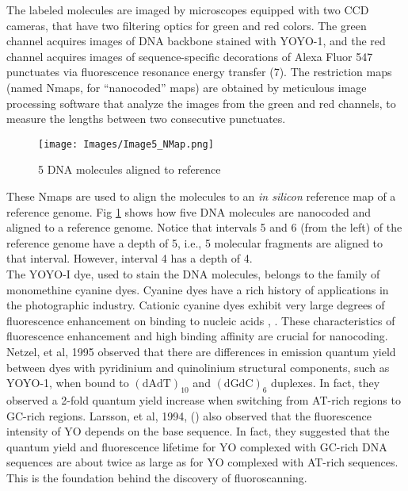 The labeled molecules are imaged by microscopes equipped with two CCD cameras, that have two filtering optics for green and red colors. The green channel acquires images of DNA backbone stained with YOYO-1, and the red channel acquires images of sequence-specific decorations of Alexa Fluor 547 punctuates via fluorescence resonance energy transfer (7). The restriction maps (named Nmaps, for ``nanocoded'' maps) are obtained by meticulous image processing software that analyze the images from the green and red channels, to measure the lengths between two consecutive punctuates. 

\begin{figure}[H]
\begin{center}
\texttt{[image: Images/Image5\_NMap.png]}
\end{center}
\caption{5 DNA molecules aligned to reference}
\label{fig:Fig2_NMap}
\end{figure}

These Nmaps are used to align the molecules to an {\emph{in silicon}} reference map of a reference genome. Fig \ref{fig:Fig2_NMap} shows how five DNA molecules are nanocoded and aligned to a reference genome. Notice that intervals 5 and 6 (from the left) of the reference genome have a depth of 5, i.e., 5 molecular fragments are aligned to that interval. However, interval 4 has a depth of 4. \\

The YOYO-I dye, used to stain the DNA molecules, belongs to the family of monomethine cyanine dyes. Cyanine dyes have a rich history of applications in the photographic industry. Cationic cyanine dyes exhibit very large degrees of fluorescence enhancement on binding to nucleic acids \cite{Rye_etal_1992_NAR}, \cite{Lee_etal_1986_Cytometry}. These characteristics of fluorescence enhancement and high binding affinity are crucial for nanocoding. Netzel, et al, 1995 \cite{Netzel_etal_1995_JPC} observed that there are differences in emission quantum yield between dyes with pyridinium and quinolinium structural components, such as YOYO-1, when bound to $(\text{dAdT})_{10}$ and $(\text{dGdC})_6$ duplexes. In fact, they observed a 2-fold quantum yield increase when switching from AT-rich regions to GC-rich regions. Larsson, et al, 1994, (\cite{Larsson_etal_1994_JACS}) also observed that the fluorescence intensity of YO depends on the base sequence. In fact, they suggested that the quantum yield and fluorescence lifetime for YO complexed with GC-rich DNA sequences are about twice as large as for YO complexed with AT-rich sequences. This is the foundation behind the discovery of fluoroscanning.  

